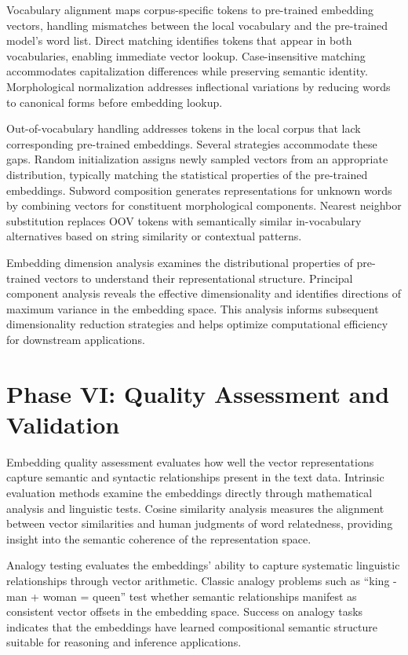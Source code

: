\documentclass[11pt,a4paper]{article}
\begin{document}
Vocabulary alignment maps corpus-specific tokens to pre-trained embedding vectors, handling mismatches between the local vocabulary and the pre-trained model's word list. Direct matching identifies tokens that appear in both vocabularies, enabling immediate vector lookup. Case-insensitive matching accommodates capitalization differences while preserving semantic identity. Morphological normalization addresses inflectional variations by reducing words to canonical forms before embedding lookup.

Out-of-vocabulary handling addresses tokens in the local corpus that lack corresponding pre-trained embeddings. Several strategies accommodate these gaps. Random initialization assigns newly sampled vectors from an appropriate distribution, typically matching the statistical properties of the pre-trained embeddings. Subword composition generates representations for unknown words by combining vectors for constituent morphological components. Nearest neighbor substitution replaces OOV tokens with semantically similar in-vocabulary alternatives based on string similarity or contextual patterns.

Embedding dimension analysis examines the distributional properties of pre-trained vectors to understand their representational structure. Principal component analysis reveals the effective dimensionality and identifies directions of maximum variance in the embedding space. This analysis informs subsequent dimensionality reduction strategies and helps optimize computational efficiency for downstream applications.

\section{Phase VI: Quality Assessment and Validation}

Embedding quality assessment evaluates how well the vector representations capture semantic and syntactic relationships present in the text data. Intrinsic evaluation methods examine the embeddings directly through mathematical analysis and linguistic tests. Cosine similarity analysis measures the alignment between vector similarities and human judgments of word relatedness, providing insight into the semantic coherence of the representation space.

Analogy testing evaluates the embeddings' ability to capture systematic linguistic relationships through vector arithmetic. Classic analogy problems such as ``king - man + woman = queen'' test whether semantic relationships manifest as consistent vector offsets in the embedding space. Success on analogy tasks indicates that the embeddings have learned compositional semantic structure suitable for reasoning and inference applications.
\end{document}

